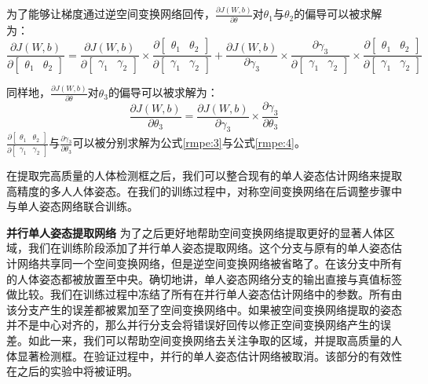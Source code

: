 为了能够让梯度通过逆空间变换网络回传，$\frac{\partial J(W, b)}{\partial \theta}$对$\theta_1$与$\theta_2$的偏导可以被求解为：
\begin{equation}
\label{rmpe:5}
\frac{\partial J(W, b)}{\partial \begin{bmatrix} \theta_1 & \theta_2\end{bmatrix}} = 
\frac{\partial J(W, b)}{\partial \begin{bmatrix} \gamma_1 & \gamma_2\end{bmatrix}} \times \frac{\partial \begin{bmatrix} \theta_1 & \theta_2\end{bmatrix}}{\partial \begin{bmatrix} \gamma_1 & \gamma_2\end{bmatrix}} + \frac{\partial J(W, b)}{\partial \gamma_3} \times \frac{\partial \gamma_3}{\partial \begin{bmatrix} \gamma_1 & \gamma_2\end{bmatrix}} \times  \frac{\partial \begin{bmatrix} \theta_1 & \theta_2\end{bmatrix}}{\partial \begin{bmatrix} \gamma_1 & \gamma_2\end{bmatrix}}
\end{equation}

同样地，$\frac{\partial J(W, b)}{\partial \theta}$对$\theta_3$的偏导可以被求解为：
\begin{equation}
\label{rmpe:6}
\frac{\partial J(W,b)}{\partial \theta_3} = \frac{\partial J(W,b)}{\partial \gamma_3} \times \frac{\partial \gamma_3}{\partial \theta_3}
\end{equation}
$\frac{\partial \begin{bmatrix} \theta_1 & \theta_2\end{bmatrix}}{\partial \begin{bmatrix} \gamma_1 & \gamma_2\end{bmatrix}}$与$\frac{\partial \gamma_3}{\partial \theta_3}$可以被分别求解为公式\eqref{rmpe:3}与公式\eqref{rmpe:4}。

在提取完高质量的人体检测框之后，我们可以整合现有的单人姿态估计网络来提取高精度的多人人体姿态。在我们的训练过程中，对称空间变换网络在后调整步骤中与单人姿态网络联合训练。

\textbf{并行单人姿态提取网络} 为了之后更好地帮助空间变换网络提取更好的显著人体区域，我们在训练阶段添加了并行单人姿态提取网络。这个分支与原有的单人姿态估计网络共享同一个空间变换网络，但是逆空间变换网络被省略了。在该分支中所有的人体姿态都被放置至中央。确切地讲，单人姿态网络分支的输出直接与真值标签做比较。我们在训练过程中冻结了所有在并行单人姿态估计网络中的参数。所有由该分支产生的误差都被累加至了空间变换网络中。如果被空间变换网络提取的姿态并不是中心对齐的，那么并行分支会将错误好回传以修正空间变换网络产生的误差。如此一来，我们可以帮助空间变换网络去关注争取的区域，并提取高质量的人体显著检测框。在验证过程中，并行的单人姿态估计网络被取消。该部分的有效性在之后的实验中将被证明。

